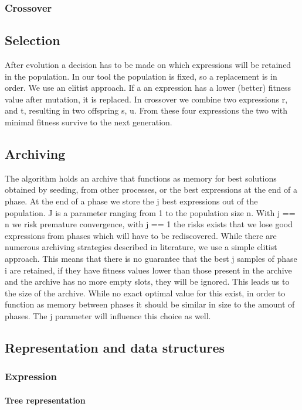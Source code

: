 \subsubsection{Crossover}
%

\subsection{Selection}
After evolution a decision has to be made on which expressions will be retained in the population. In our tool the population is fixed, so a replacement is in order. We use an elitist approach. If a an expression has a lower (better) fitness value after mutation, it is replaced. 
In crossover we combine two expressions r, and t, resulting in two offspring s, u. 
From these four expressions the two with minimal fitness survive to the next generation.

\subsection{Archiving}
The algorithm holds an archive that functions as memory for best solutions obtained by seeding, from other processes, or the best expressions at the end of a phase.
At the end of a phase we store the j best expressions out of the population. J is a parameter ranging from 1 to the population size n. With j == n we risk premature convergence, with j == 1 the risks exists that we lose good expressions from phases which will have to be rediscovered. 
While there are numerous archiving strategies described in literature, we use a simple elitist approach. This means that there is no guarantee that the best j samples of phase i are retained, if they have fitness values lower than those present in the archive and the archive has no more empty slots, they will be ignored.
This leads us to the size of the archive. While no exact optimal value for this exist, in order to function as memory between phases it should be similar in size to the amount of phases. The j parameter will influence this choice as well.

\subsection{Representation and data structures}
\subsubsection{Expression}
\paragraph{Tree representation}

